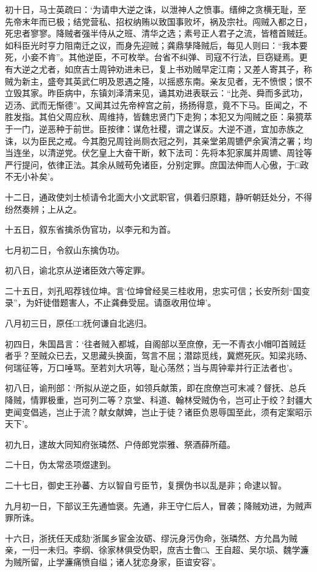 \documentclass[]{article}
\begin{document}
初十日，马士英疏曰：`为请申大逆之诛，以泄神人之愤事。缙绅之贪横无耻，至先帝末年而已极；结党营私、招权纳贿以致国事败坏，祸及宗社。闯贼入都之日，死忠者寥寥。降贼者强半侍从之班、清华之选；素号正人君子之流，皆稽首贼廷。如科臣光时亨力阻南迁之议，而身先迎贼；龚鼎孳降贼后，每见人则曰：``我本要死，小妾不肯''。其他逆臣，不可枚举。台省不纠弹、司寇不行法，巨窃疑焉。更有大逆之尤者，如庶吉士周钟劝进未已，复上书劝贼早定江南；又差人寄其子，称贼为新主，盛夸其英武仁明及恩遇之隆，以摇惑东南。亲友见者，无不愤恨；恨不立毁其家。昨臣病中，东镇刘泽清来见，诵其劝进表联云：``比尧、舜而多武功，迈汤、武而无惭德''。又闻其过先帝梓宫之前，扬扬得意，竟不下马。臣闻之，不胜发指。其伯父周应秋、周维持，皆魏忠贤门下走狗；本犯又为闯贼之臣：枭獍萃于一门，逆恶种于前世。臣按律：谋危社稷，谓之谋反。大逆不道，宜加赤族之诛，以为臣民之戒。今其胞兄周铨尚厕衣冠之列，其亲堂弟周镳俨余寅清之署；均当连坐，以清逆党。伏乞皇上大奋干断，敕下法司：先将本犯家属并周镳、周铨等严行提问，依律正法。其余从贼苟免诸臣，分别定罪。庶国法伸而人心傲，于□政不无小补矣'。

十二日，通政使刘士桢请令北面大小文武职官，俱着归原籍，静听朝廷处分，不得纷然奏辨；上从之。

十五日，叙东省擒杀伪官功，以李元和为首。

七月初二日，令叙山东擒伪功。

初八日，谕北京从逆诸臣效六等定罪。

二十五日，刘孔昭荐钱位坤。言`位坤曾经吴三桂收用，忠实可信；长安所刻``国变录''，为奸徒借题害人，不止龚彝受屈。请亟收用位坤'。

八月初三日，原任□□抚何谦自北逃归。

初四日，朱国昌言：`往者贼入都城，自阁部以至庶僚，无一不青衣小帽叩首贼廷者乎？至贼众已去，又思藏头换面，驾言不屈；潜踪觅线，冀燃死灰。知梁兆旸、何瑞征等，万口唾骂。至若刘大巩等，耻心荡然；当与周钟辈并行正法者也'。

初八日，谕刑部：`所拟从逆之臣，如领兵献策，即在庶僚岂可末减？督抚、总兵降贼，情罪极重，岂可列二等？京堂、科道、翰林受贼伪令，岂可止于绞？封疆大吏闻变倡逃，岂止于流？献女献婢，岂止于徒？诸臣负恩辱国至此，须有定案昭示天下'。

初九日，逮故大同知府张璘然、户侍郎党崇雅、祭酒薛所蕴。

二十日，伪太常丞项煜逮到。

二十七日，御史王孙蕃、方以智自亏臣节，复撰伪书以乱是非；命逮以智。

九月初一日，下部议王先通恤褒。先通，非王守仁后人，冒袭；降贼劝进，为贼声罪所诛。

十六日，浙抚任天成劾`浙属乡宦金汝砺、缪沅身污伪命，张璘然、方允昌为贼亲，一归一未归。李纲、徐家林俱受伪职，庶吉士鲁□、王自超、吴尔埙、魏学濂为贼所留，止学濂痛愤自缢；诸人犹恋身家，臣谊安容'。
\end{document}
